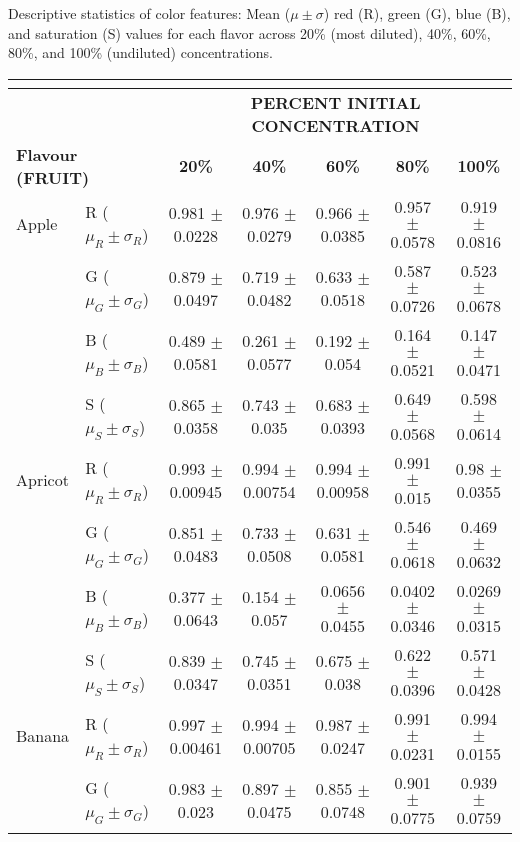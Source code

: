 \documentclass[authoryear]{elsarticle}
\begin{document}
  	\centering
  	\caption{Descriptive statistics of color features: Mean ($\mu \pm \sigma$) red (R), green (G), blue (B), and saturation (S) values for each flavor across 20\% (most diluted), 40\%, 60\%, 80\%, and 100\% (undiluted) concentrations.}
\begin{tabular}{llccccc}
	\multicolumn{7}{c}{}\\
	\toprule
    \multicolumn{1}{r}{} & & \multicolumn{5}{c}{\textbf{PERCENT INITIAL CONCENTRATION}} \\
    \midrule
    \multicolumn{2}{l}{\textbf{Flavour (FRUIT)}} & \textbf{20\%} & \textbf{40\%} & \textbf{60\%} & \textbf{80\%} & \textbf{100\%} \\
    \midrule
    Apple 		 & R ($\mu_R \pm \sigma_R$) & 0.981 $\pm$ 0.0228 & 0.976 $\pm$ 0.0279 & 0.966 $\pm$ 0.0385 & 0.957 $\pm$ 0.0578 & 0.919 $\pm$ 0.0816 \\
       			 & G ($\mu_G \pm \sigma_G$) & 0.879 $\pm$ 0.0497 & 0.719 $\pm$ 0.0482 & 0.633 $\pm$ 0.0518 & 0.587 $\pm$ 0.0726 & 0.523 $\pm$ 0.0678 \\
         		 & B ($\mu_B \pm \sigma_B$) & 0.489 $\pm$ 0.0581 & 0.261 $\pm$ 0.0577 & 0.192 $\pm$ 0.054 & 0.164 $\pm$ 0.0521 & 0.147 $\pm$ 0.0471 \\
         		 & S ($\mu_S \pm \sigma_S$) & 0.865 $\pm$ 0.0358 & 0.743 $\pm$ 0.035 & 0.683 $\pm$ 0.0393 & 0.649 $\pm$ 0.0568 & 0.598 $\pm$ 0.0614 \\
	\midrule
	Apricot 	 & R ($\mu_R \pm \sigma_R$) & 0.993 $\pm$ 0.00945 & 0.994 $\pm$ 0.00754 & 0.994 $\pm$ 0.00958 & 0.991 $\pm$ 0.015 & 0.98 $\pm$ 0.0355 \\
    			 & G ($\mu_G \pm \sigma_G$) & 0.851 $\pm$ 0.0483 & 0.733 $\pm$ 0.0508 & 0.631 $\pm$ 0.0581 & 0.546 $\pm$ 0.0618 & 0.469 $\pm$ 0.0632 \\
          		 & B ($\mu_B \pm \sigma_B$) & 0.377 $\pm$ 0.0643 & 0.154 $\pm$ 0.057 & 0.0656 $\pm$ 0.0455 & 0.0402 $\pm$ 0.0346 & 0.0269 $\pm$ 0.0315 \\
          		 & S ($\mu_S \pm \sigma_S$) & 0.839 $\pm$ 0.0347 & 0.745 $\pm$ 0.0351 & 0.675 $\pm$ 0.038 & 0.622 $\pm$ 0.0396 & 0.571 $\pm$ 0.0428 \\
    \midrule
	Banana		 & R ($\mu_R \pm \sigma_R$) & 0.997 $\pm$ 0.00461 & 0.994 $\pm$ 0.00705 & 0.987 $\pm$ 0.0247 & 0.991 $\pm$ 0.0231 & 0.994 $\pm$ 0.0155 \\
         		 & G ($\mu_G \pm \sigma_G$) & 0.983 $\pm$ 0.023 & 0.897 $\pm$ 0.0475 & 0.855 $\pm$ 0.0748 & 0.901 $\pm$ 0.0775 & 0.939 $\pm$ 0.0759 \\

\end{tabular}
\end{document}
